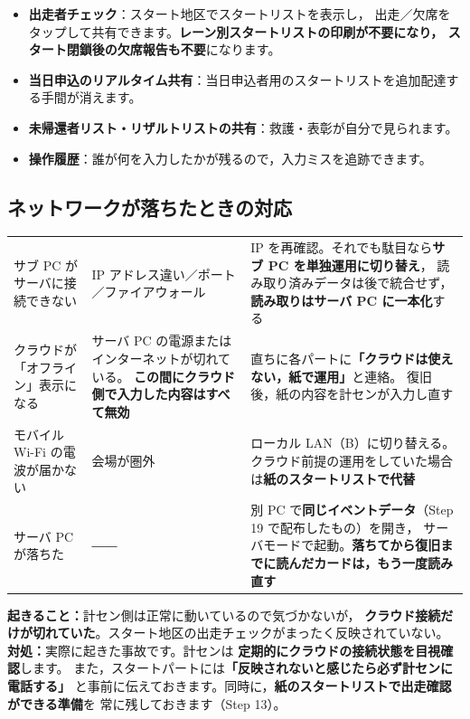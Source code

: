 \begin{Note}[クラウドでできること]
\begin{itemize}
\item \textbf{出走者チェック}：スタート地区でスタートリストを表示し，
      出走／欠席をタップして共有できます。\textbf{レーン別スタートリストの印刷が不要になり，
      スタート閉鎖後の欠席報告も不要}になります。
\item \textbf{当日申込のリアルタイム共有}：当日申込者用のスタートリストを追加配達する手間が消えます。
\item \textbf{未帰還者リスト・リザルトリストの共有}：救護・表彰が自分で見られます。
\item \textbf{操作履歴}：誰が何を入力したかが残るので，入力ミスを追跡できます。
\end{itemize}
\end{Note}

\subsection*{ネットワークが落ちたときの対応}

\begin{center}
\small
\begin{tabular}{@{}P{34mm}P{50mm}P{60mm}@{}}
\toprule
{} &  &  \\
\midrule
サブ PC がサーバに接続できない
  & IP アドレス違い／ポート／ファイアウォール
  & IP を再確認。それでも駄目なら\textbf{サブ PC を単独運用に切り替え}，
    読み取り済みデータは後で統合せず，\textbf{読み取りはサーバ PC に一本化}する \\
クラウドが「オフライン」表示になる
  & サーバ PC の電源またはインターネットが切れている。
    \textbf{この間にクラウド側で入力した内容はすべて無効}
  & 直ちに各パートに\textbf{「クラウドは使えない，紙で運用」}と連絡。
    復旧後，紙の内容を計センが入力し直す \\
モバイル Wi-Fi の電波が届かない
  & 会場が圏外
  & ローカル LAN（B）に切り替える。
    クラウド前提の運用をしていた場合は\textbf{紙のスタートリストで代替} \\
サーバ PC が落ちた
  & ―― & 別 PC で\textbf{同じイベントデータ}（Step 19 で配布したもの）を開き，
    サーバモードで起動。\textbf{落ちてから復旧までに読んだカードは，もう一度読み直す} \\
\bottomrule
\end{tabular}
\end{center}

\begin{Fail}
\textbf{起きること：}計セン側は正常に動いているので気づかないが，
\textbf{クラウド接続だけが切れていた}。スタート地区の出走チェックがまったく反映されていない。\\
\textbf{対処：}実際に起きた事故です。計センは
\textbf{定期的にクラウドの接続状態を目視確認}します。
また，スタートパートには\textbf{「反映されないと感じたら必ず計センに電話する」}
と事前に伝えておきます。同時に，\textbf{紙のスタートリストで出走確認ができる準備}を
常に残しておきます（Step 13）。
\end{Fail}

